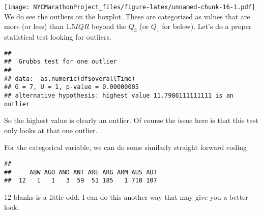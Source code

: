 \documentclass[
]{article}
\newenvironment{Shaded}{\begin{snugshade}}{\end{snugshade}}
\newcommand{\AttributeTok}[1]{\textcolor[rgb]{0.13,0.29,0.53}{#1}}
\newcommand{\CommentTok}[1]{\textcolor[rgb]{0.56,0.35,0.01}{\textit{#1}}}
\newcommand{\DecValTok}[1]{\textcolor[rgb]{0.00,0.00,0.81}{#1}}
\newcommand{\FunctionTok}[1]{\textcolor[rgb]{0.13,0.29,0.53}{\textbf{#1}}}
\newcommand{\NormalTok}[1]{#1}
\newcommand{\SpecialCharTok}[1]{\textcolor[rgb]{0.81,0.36,0.00}{\textbf{#1}}}
\begin{document}
\texttt{[image: NYCMarathonProject\_files/figure-latex/unnamed-chunk-16-1.pdf]}
We do see the outliers on the boxplot. These are categorized as values
that are more (or less) than \(1.5IQR\) beyond the \(Q_3\) (or \(Q_1\)
for below). Let's do a proper statistical test looking for outliers.

\begin{Shaded}
\end{Shaded}

\begin{verbatim}
## 
##  Grubbs test for one outlier
## 
## data:  as.numeric(df$overallTime)
## G = 7, U = 1, p-value = 0.00000005
## alternative hypothesis: highest value 11.7986111111111 is an outlier
\end{verbatim}

So the highest value is clearly an outlier. Of course the issue here is
that this test only looks at that one outlier.

For the categorical variable, we can do some similarly straight forward
coding

\begin{Shaded}
\end{Shaded}

\begin{verbatim}
## 
##     ABW AGO AND ANT ARE ARG ARM AUS AUT 
##  12   1   1   3  59  51 185   1 710 107
\end{verbatim}

12 blanks is a little odd. I can do this another way that may give you a
better look.

\begin{Shaded}
\end{Shaded}
\end{document}
